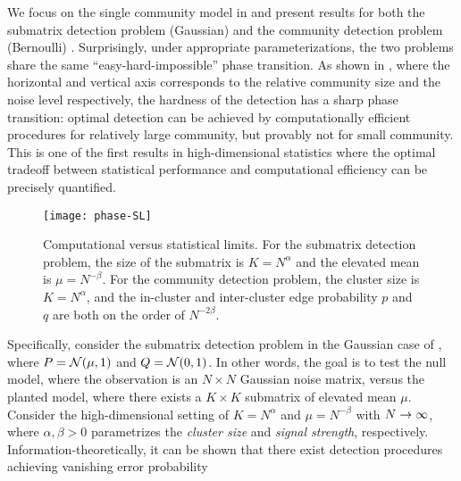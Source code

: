 We focus on the single community model in  and present results for both the submatrix detection problem 
(Gaussian) \cite{ma2013submatrix} and the community detection problem (Bernoulli) \cite{HajekWuXu14}. 
Surprisingly, under appropriate parameterizations, the two problems share the same ``easy-hard-impossible'' phase transition. 
As shown in , where the horizontal and vertical axis corresponds to the relative community size and the noise level respectively, the hardness of the detection has a sharp phase transition: optimal detection can be achieved by computationally efficient procedures for relatively large community, but provably not for small community. This is one of the first results in high-dimensional statistics where the optimal tradeoff between statistical performance and computational efficiency can be precisely quantified.
\begin{figure}[ht]%
\centering
\texttt{[image: phase-SL]}
	\caption{Computational versus statistical limits. For the submatrix detection problem, the size of the submatrix is $K = N^\alpha$ and the elevated mean is $\mu = N^{-\beta}$. For the community detection problem, the cluster size is $K=N^{\alpha}$, and the in-cluster and inter-cluster edge probability $p$ and $q $ are both on the order of $N^{-2\beta}$. }
	\label{fig:phase}	
\end{figure}
Specifically, consider the submatrix detection problem in the Gaussian case of , where $P={\mathcal{N}}(\mu,1)$ and $Q={\mathcal{N}}(0,1)$. In other words,  the goal is to test the null model, where the observation is an $N\times N$ Gaussian noise matrix, versus the planted model, where there exists a $K\times K$ submatrix of elevated mean $\mu$. Consider the high-dimensional setting of $K = N^\alpha$ and $\mu = N^{-\beta}$ with $N\to\infty$, where $\alpha,\beta>0$ parametrizes the \emph{cluster size} and \emph{signal strength}, respectively. 
Information-theoretically, it can be shown that 
there exist detection procedures achieving vanishing error probability
